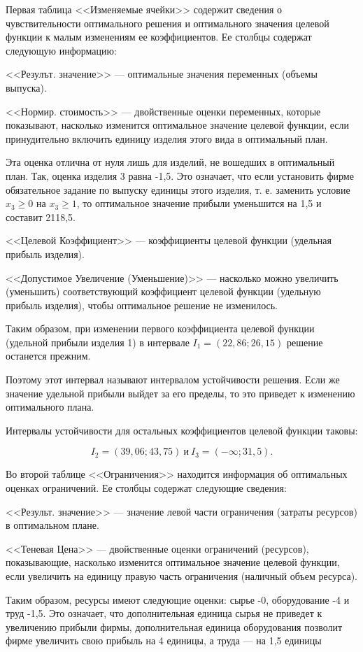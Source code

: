 Первая таблица <<Изменяемые ячейки>> содержит сведения о чувствительности оптимального решения и оптимального значения целевой функции к малым изменениям ее коэффициентов. Ее столбцы содержат следующую информацию:

<<Резулът. значение>> --- оптимальные значения переменных (объемы выпуска).

<<Нормир. стоимость>> --- двойственные оценки переменных, которые показывают, насколько изменится оптимальное значение целевой функ­ции, если принудительно включить единицу изделия этого вида в оптимальный план.

Эта оценка отлична от нуля лишь для изделий, не вошедших в оптимальный план. Так, оценка изделия 3 равна -1,5. Это означает, что если установить фирме обязательное задание по выпуску единицы этого изделия, т. е. заменить условие $x_3 \geq 0$ на $x_3 \geq 1$, то оптимальное значение прибыли уменьшится на 1,5 и составит 2118,5.

<<Целевой Коэффициент>> --- коэффициенты целевой функции (удельная прибыль изделия).

<<Допустимое Увеличение (Уменьшение)>> --- насколько можно увеличить (уменьшить) соответствующий коэффициент целевой функции (удельную прибыль изделия), чтобы оптимальное решение не изменилось.

Таким образом, при изменении первого коэффициента целевой функции (удельной прибыли изделия 1) в интервале $I_1= (22,86; 26,15)$ решение останется прежним.

Поэтому этот интервал называют интервалом устойчивости решения. Если же значение удельной прибыли выйдет за его пределы, то это приведет к изменению оптимального плана.%

Интервалы устойчивости для остальных коэффициентов целевой функции таковы:

\[ I_2 = (39, 06 ; 43,75)\ \text{и} \  I_3 = ( -\infty ;31,5). \]

Во второй таблице <<Ограничения>> находится информация об оптимальных оценках ограничений. Ее столбцы содержат следующие сведения:

<<Результ. значение>> --- значение левой части ограничения (затраты ресурсов) в оптимальном плане.

<<Теневая Цена>> --- двойственные оценки ограничений (ресурсов), показывающие, насколько изменится оптимальное значение целевой функции, если увеличить на единицу правую часть ограничения (наличный объем ресурса).

Таким образом, ресурсы имеют следующие оценки: сырье -0, оборудование -4 и труд -1,5. Это означает, что дополнительная единица сырья не приведет к увеличению прибыли фирмы, дополнительная единица оборудования позволит фирме увеличить свою прибыль на 4 единицы, а труда --- на 1,5 единицы



